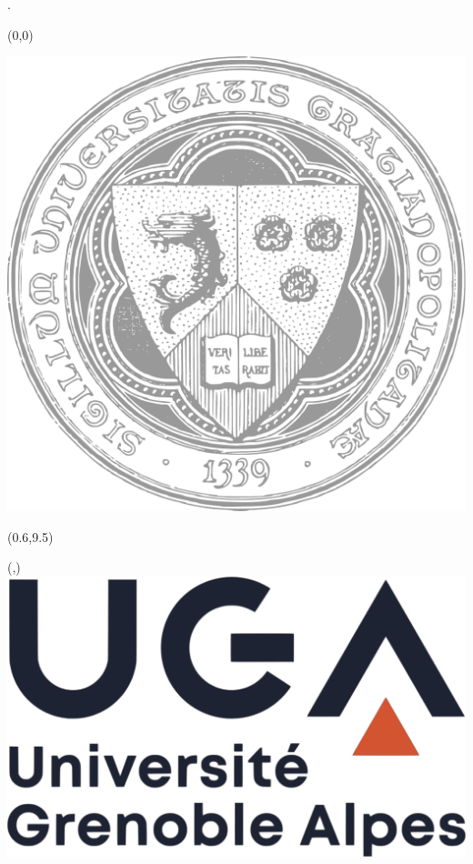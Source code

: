 \documentclass[a4paper, twoside]{report}
\begin{document}
\thispagestyle{empty}
.
\begin{textblock}{5}(0,0)
	\begin{center}
	    	\includegraphics[scale=0.30]{cover/uga_logo.pdf}
	\end{center}{}
	\vspace{300mm}
\end{textblock}

\begin{textblock}{1}(0.6,9.5)
	
	\Huge{}
\end{textblock}


\begin{textblock}{1}(\hpos,\vpos)
	\includegraphics[scale=0.1]{cover/uga_logo_2.pdf}	
\end{textblock}
\end{document}
